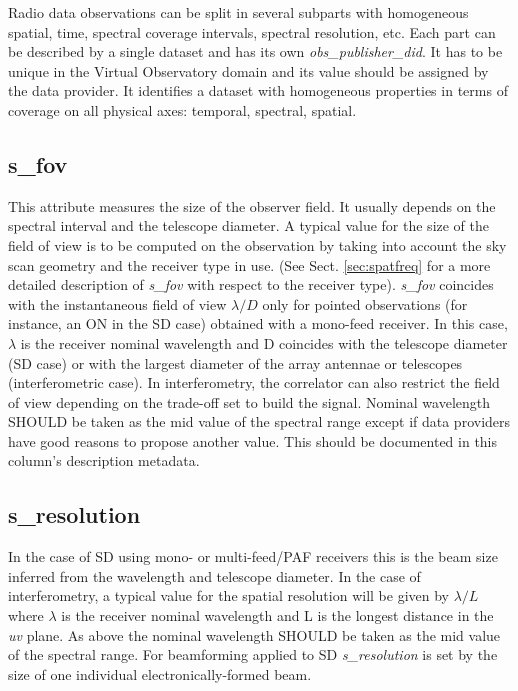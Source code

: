 \documentclass[11pt,a4paper]{ivoa}
\begin{document}
Radio data observations can be split in several subparts with homogeneous spatial,
time, spectral coverage intervals, spectral resolution, etc. Each part can be described by
a single dataset and has its own \emph{obs\_publisher\_did}. 
It has to be unique in the Virtual Observatory domain and its value should be assigned 
by the data provider. 
It identifies a dataset with homogeneous properties in terms of coverage on all physical axes:
temporal, spectral, spatial.

\subsection{s\_fov}
\label{sec:fov}
This attribute measures the size of the observer field. 
It usually depends on the spectral interval and the telescope diameter.
A typical value for  the size of the field of view is to be computed on the observation by taking into account the sky scan geometry and the receiver type in use. (See Sect. \ref{sec:spatfreq} for  a more detailed description of \emph{s\_fov} with respect to the receiver type).
\emph{s\_fov } coincides with the instantaneous field of view $\lambda / D$ only for pointed observations (for instance, an ON in the SD case) obtained with a mono-feed receiver. In this case, $\lambda$ is the
receiver nominal wavelength and D coincides with the telescope diameter (SD case) or with the largest diameter of the array antennae or telescopes (interferometric case).
In interferometry, the correlator can also restrict the field of view depending on the trade-off set to build the signal. 
Nominal wavelength SHOULD be taken as the mid value of the spectral range except if data providers have good reasons to propose another value. This should be documented in this column's description metadata.

\subsection{s\_resolution}
\label{sec:res}
In the case of SD using mono- or multi-feed/PAF receivers this is the beam size inferred from the wavelength and telescope diameter.
In the case of interferometry, a typical value for the spatial resolution will be given by $\lambda / L$ where $\lambda$
is the %
receiver nominal wavelength and L is the longest distance in the \emph{uv} plane.
As above the nominal wavelength SHOULD be taken as the mid value of the spectral range.
For beamforming applied to SD \emph{s\_resolution} is set by the size of one individual electronically-formed beam.
\end{document}
